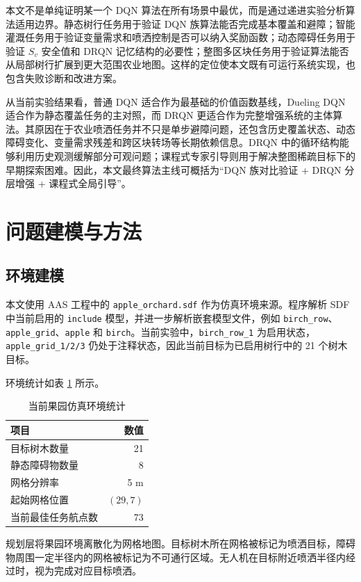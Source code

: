 \documentclass[UTF8]{ctexart}
\begin{document}
本文不是单纯证明某一个 DQN 算法在所有场景中最优，而是通过递进实验分析算法适用边界。静态树行任务用于验证 DQN 族算法能否完成基本覆盖和避障；智能灌溉任务用于验证变量需求和喷洒控制是否可以纳入奖励函数；动态障碍任务用于验证 $S_v$ 安全值和 DRQN 记忆结构的必要性；整图多区块任务用于验证算法能否从局部树行扩展到更大范围农业地图。这样的定位使本文既有可运行系统实现，也包含失败诊断和改进方案。

从当前实验结果看，普通 DQN 适合作为最基础的价值函数基线，Dueling DQN 适合作为静态覆盖任务的主对照，而 DRQN 更适合作为完整增强系统的主体算法。其原因在于农业喷洒任务并不只是单步避障问题，还包含历史覆盖状态、动态障碍变化、变量需求残差和跨区块转场等长期依赖信息。DRQN 中的循环结构能够利用历史观测缓解部分可观问题；课程式专家引导则用于解决整图稀疏目标下的早期探索困难。因此，本文最终算法主线可概括为“DQN 族对比验证 + DRQN 分层增强 + 课程式全局引导”。

\section{问题建模与方法}

\subsection{环境建模}

本文使用 AAS 工程中的 \texttt{apple\_orchard.sdf} 作为仿真环境来源。程序解析 SDF 中当前启用的 \texttt{include} 模型，并进一步解析嵌套模型文件，例如 \texttt{birch\_row}、\texttt{apple\_grid}、\texttt{apple} 和 \texttt{birch}。当前实验中，\texttt{birch\_row\_1} 为启用状态，\texttt{apple\_grid\_1/2/3} 仍处于注释状态，因此当前目标为已启用树行中的 21 个树木目标。

环境统计如表 \ref{tab:env} 所示。

\begin{table}[H]
\centering
\caption{当前果园仿真环境统计}
\label{tab:env}
\begin{tabular}{lr}
\toprule
项目 & 数值 \\
\midrule
目标树木数量 & 21 \\
静态障碍物数量 & 8 \\
网格分辨率 & 5 m \\
起始网格位置 & $(29, 7)$ \\
当前最佳任务航点数 & 73 \\
\bottomrule
\end{tabular}
\end{table}

规划层将果园环境离散化为网格地图。目标树木所在网格被标记为喷洒目标，障碍物周围一定半径内的网格被标记为不可通行区域。无人机在目标附近喷洒半径内经过时，视为完成对应目标喷洒。
\end{document}
